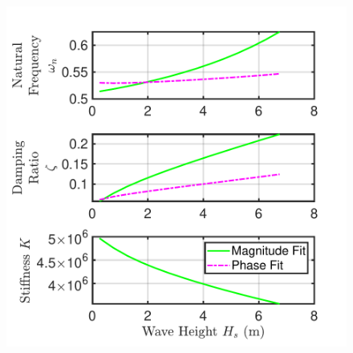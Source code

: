 \documentclass[10pt,twoside]{article}
\newif\ifplaceholder
\let\originalincludegraphics\includegraphics
\renewcommand{\includegraphics}[2][]{%
  \ifplaceholder
    \begin{tikzpicture}
      \node[anchor=south west, inner sep=0] (img) at (0,0) {\originalincludegraphics[#1]{#2}};
      \node at ($(img.south east)!0.5!(img.north west)$)
        [fill=white,opacity=0.8,text=red,font=\huge] {Placeholder};
    \end{tikzpicture}
    \vspace{-\baselineskip}
  \else
    \originalincludegraphics[#1]{#2}%
  \fi
  \placeholderfalse %
}
\begin{document}
\begin{figure}[bth]
\noindent
\begin{minipage}[b]{0.565\textwidth}
    \centering
    \includegraphics[width=\linewidth]{figures/fit_wave_height_trend.pdf}
    \label{fig:fit-versus-wave-height}
\end{minipage}
\hfill
\begin{minipage}[b]{0.435\textwidth}
    \centering

\end{minipage}
\end{figure}
\end{document}
